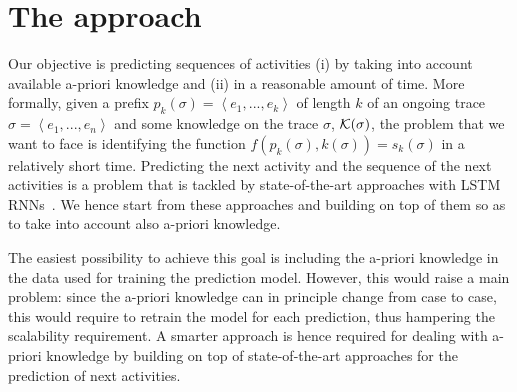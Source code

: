\section{The approach} %
\label{sec:our_approach}

Our objective is predicting sequences of activities (i) by taking into account available a-priori knowledge and (ii) in a reasonable amount of time. 
More formally, given a prefix $p_k(\sigma)=\left\langle e_1, ..., e_k\right\rangle$ of length $k$ of an ongoing trace $\sigma=\left\langle e_1, ..., e_n\right\rangle$ and some knowledge on the trace $\sigma$, $\cal{K}(\sigma)$, the problem that we want to face is identifying the function $f(p_k(\sigma), k(\sigma)) = s_k(\sigma)$ in a relatively short time.
Predicting the next activity and the sequence of the next activities is a problem that is tackled by state-of-the-art approaches with LSTM RNNs~\cite{quteprints96732,evermann,niek96732}. We hence start from these approaches and building on top of them so as to take into account also a-priori knowledge.

The easiest possibility to achieve this goal is including the a-priori knowledge in the data used for training the prediction model. However, this would raise a main problem: since the a-priori knowledge can in principle change from case to case, this would require to retrain the model for each prediction, thus hampering the scalability requirement. A smarter approach is hence required for dealing with a-priori knowledge by building on top of state-of-the-art approaches for the prediction of next activities.  

